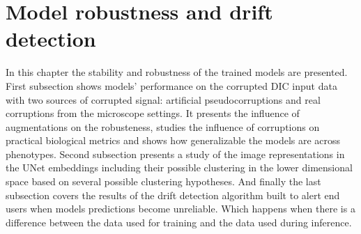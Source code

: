 \section{Model robustness and drift detection}
    In this chapter the stability and robustness of the trained models are presented. First subsection shows models' performance on the corrupted DIC input data with two sources of corrupted signal: artificial pseudocorruptions and real corruptions from the microscope settings. It presents the influence of augmentations on the robusteness, studies the influence of corruptions on practical biological metrics and shows how generalizable the models are across phenotypes. Second subsection presents a study of the image representations in the UNet embeddings including their possible clustering in the lower dimensional space based on several possible clustering hypotheses. And finally the last subsection covers the results of the drift detection algorithm built to alert end users when models predictions become unreliable. Which happens when there is a difference between the data used for training and the data used during inference. 
    
    \pagebreak
    
    \pagebreak
    